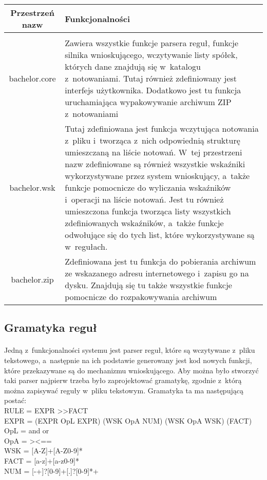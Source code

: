 \begin{tabular}{ c p{}}
Przestrzeń nazw & Funkcjonalności \\ \hline \\
bachelor.core & Zawiera wszystkie funkcje parsera reguł, funkcje silnika wnioskującego, wczytywanie listy spółek, których dane znajdują się w~katalogu z~notowaniami. Tutaj również zdefiniowany jest interfejs użytkownika. Dodatkowo jest tu funkcja uruchamiająca wypakowywanie archiwum ZIP z~notowaniami \\
bachelor.wsk & Tutaj zdefiniowana jest funkcja wczytująca notowania z~pliku i~tworząca z~nich odpowiednią strukturę umieszczaną na liście notowań. W~tej przestrzeni nazw zdefiniowane są również wszystkie wskaźniki wykorzystywane przez system wnioskujący, a~także funkcje pomocnicze do wyliczania wskaźników i~operacji na liście notowań. Jest tu również umieszczona funkcja tworząca listy wszystkich zdefiniowanych wskaźników, a~także funkcje odwołujące się do tych list, które wykorzystywane są w~regułach. \\
bachelor.zip & Zdefiniowana jest tu funkcja do pobierania archiwum ze wskazanego adresu internetowego i~zapisu go na dysku. Znajdują się tu także wszystkie funkcje pomocnicze do rozpakowywania archiwum \\
\end{tabular}

\subsection{Gramatyka reguł}

\paragraph{}
Jedną z~funkcjonalności systemu jest parser reguł, które są wczytywane z~pliku tekstowego, a~następnie na ich podstawie generowany jest kod nowych funkcji, które przekazywane są do mechanizmu wnioskującego. Aby można było stworzyć taki parser najpierw trzeba było zaprojektować gramatykę, zgodnie z~którą można zapisywać reguły w~pliku tekstowym. Gramatyka ta ma następującą postać:\\
RULE = EXPR \textgreater\textgreater FACT \\
EXPR = (EXPR OpL EXPR) \textbar\space (WSK OpA NUM) \textbar\space (WSK OpA WSK) \textbar\space (FACT) \\
OpL = and \textbar\space or \\
OpA = \textgreater\space\textbar\space \textless \space\textbar\space == \\
WSK = [A-Z]+[A-Z0-9]* \\
FACT = [a-z]+[a-z0-9]* \\
NUM = [-+]?[0-9]+[.]?[0-9]*\textbar[0-9]+ \\

